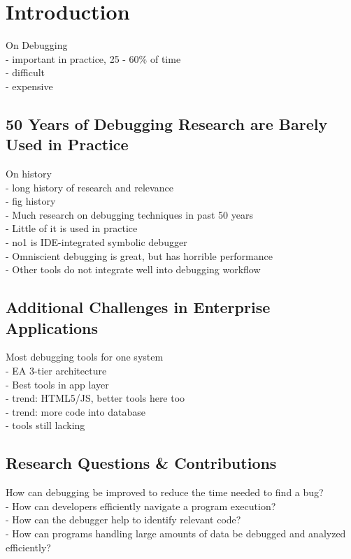 \chapter{Introduction}
\label{sec:introduction}

On Debugging
\\- important in practice, 25 - 60\% of time 
\\- difficult
\\- expensive

\section{50 Years of Debugging Research are Barely Used in Practice}

On history
\\- long history of research and relevance
\\- fig history
\\- Much research on debugging techniques in past 50 years
\\- Little of it is used in practice
\\- no1 is IDE-integrated symbolic debugger
\\- Omniscient debugging is great, but has horrible performance
\\- Other tools do not integrate well into debugging workflow


\section{Additional Challenges in Enterprise Applications}

Most debugging tools for one system
\\- EA 3-tier architecture
\\- Best tools in app layer
\\- trend: HTML5/JS, better tools here too
\\- trend: more code into database
\\- tools still lacking

\section{Research Questions \& Contributions}

How can debugging be improved to reduce the time needed to find a bug?
\\- How can developers efficiently navigate a program execution?
\\- How can the debugger help to identify relevant code?
\\- How can programs handling large amounts of data be debugged and analyzed efficiently?

